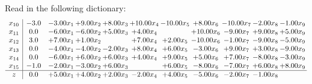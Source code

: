 \documentclass[9pt]{article}
\begin{document}
Read in the following dictionary:
\[\begin{array}{c| c c@{\hskip 2pt} c@{\hskip 2pt} c@{\hskip 2pt} c@{\hskip 2pt} c@{\hskip 2pt} c@{\hskip 2pt} c@{\hskip 2pt} c@{\hskip 2pt} c@{\hskip 2pt} }
 x_{10}   &  -3.0 & -3.00 x_{1} & +  9.00 x_{2} & +  8.00 x_{3} & + 10.00 x_{4} & -10.00 x_{5} & +  8.00 x_{6} & -10.00 x_{7} & -2.00 x_{8} & -1.00 x_{9}\\
 x_{11}   &  0.0 & -6.00 x_{1} & -6.00 x_{2} & +  5.00 x_{3} & +  4.00 x_{4} &   & + 10.00 x_{6} & -9.00 x_{7} & +  9.00 x_{8} & +  5.00 x_{9}\\
 x_{12}   &  3.0 & +  7.00 x_{1} & +  1.00 x_{2} &   & +  7.00 x_{4} & +  2.00 x_{5} & -10.00 x_{6} & -1.00 x_{7} & -9.00 x_{8} & -5.00 x_{9}\\
 x_{13}   &  0.0 & -4.00 x_{1} & -4.00 x_{2} & -2.00 x_{3} & +  8.00 x_{4} & +  6.00 x_{5} & -3.00 x_{6} & +  9.00 x_{7} & +  3.00 x_{8} & -9.00 x_{9}\\
 x_{14}   &  0.0 & -6.00 x_{1} & +  6.00 x_{2} & +  6.00 x_{3} & +  4.00 x_{4} & +  9.00 x_{5} & +  5.00 x_{6} & +  7.00 x_{7} & -8.00 x_{8} & -3.00 x_{9}\\
 x_{15}   &  -1.0 & -2.00 x_{1} & -3.00 x_{2} & +  6.00 x_{3} &   & +  6.00 x_{5} & -8.00 x_{6} & -7.00 x_{7} & +  6.00 x_{8} & +  8.00 x_{9}\\
\hline
z    &  0.0 & +  5.00 x_{1} & +  4.00 x_{2} & +  2.00 x_{3} & -2.00 x_{4} & +  4.00 x_{5} & -5.00 x_{6} & -2.00 x_{7} & -1.00 x_{8} &   \\
\end{array}\]
\end{document}
